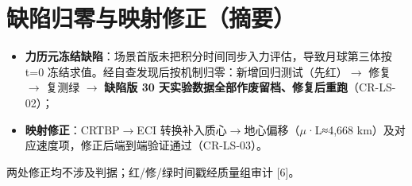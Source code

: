 \documentclass[UTF8,fontset=none]{ctexbook}
\begin{document}
\chapter{缺陷归零与映射修正（摘要）}
\begin{itemize}
\item \textbf{力历元冻结缺陷}：场景首版未把积分时间同步入力评估，导致月球第三体按 t=0 冻结求值。经自查发现后按机制归零：新增回归测试（先红）$\to$ 修复 $\to$ 复测绿 $\to$ \textbf{缺陷版 30 天实验数据全部作废留档、修复后重跑}（CR-LS-02）；
\item \textbf{映射修正}：CRTBP$\to$ECI 转换补入质心$\to$地心偏移（$\mu$·L≈4,668 km）及对应速度项，修正后端到端验证通过（CR-LS-03）。
\end{itemize}
两处修正均不涉及判据；红/修/绿时间戳经质量组审计 [6]。\par
\end{document}
